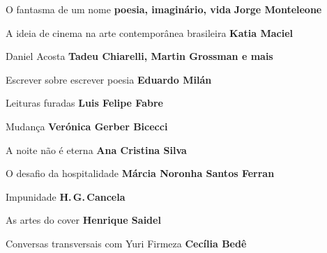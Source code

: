 \begin{multicols}{2}
\begin{enumerate}
{\item O fantasma de um nome \textbf{poesia, imaginário, vida} \textbf{Jorge Monteleone}
\item A ideia de cinema na arte contemporânea brasileira \textbf{Katia Maciel}
\item Daniel Acosta \textbf{Tadeu Chiarelli, Martin Grossman e mais}
\item Escrever sobre escrever poesia \textbf{Eduardo Milán}
\item Leituras furadas \textbf{Luis Felipe Fabre}
\item Mudança \textbf{Verónica Gerber Bicecci}
\item A noite não é eterna \textbf{Ana Cristina Silva}
\item O desafio da hospitalidade \textbf{Márcia Noronha Santos Ferran}
\item Impunidade \textbf{H.\,G.\,Cancela}
\item As artes do cover \textbf{Henrique Saidel}
\item Conversas transversais com Yuri Firmeza \textbf{Cecília Bedê}
}
\end{enumerate}
\end{multicols}

\pagebreak
